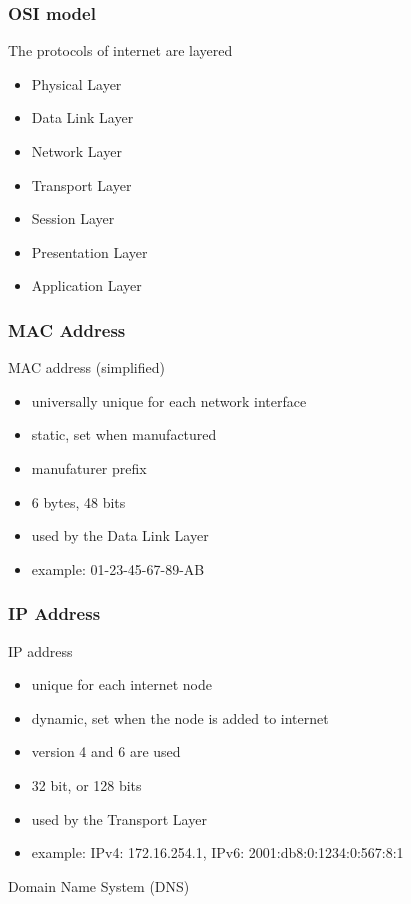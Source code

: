 \begin{frame}[fragile] \frametitle{OSI model}
The protocols of internet are layered
\begin{itemize}
  \item Physical Layer
  \item Data Link Layer
  \item Network Layer
  \item Transport Layer
  \item Session Layer
  \item Presentation Layer
  \item Application Layer
\end{itemize}
\end{frame}

\begin{frame}[fragile]\frametitle{MAC Address}
MAC address (simplified)
\begin{itemize}
  \item universally unique for each network interface
  \item static, set when manufactured
  \item manufaturer prefix
  \item 6 bytes, 48 bits
  \item used by the Data Link Layer
  \item example: 01-23-45-67-89-AB
\end{itemize}
\end{frame}

\begin{frame}[fragile]\frametitle{IP Address}
IP address
\begin{itemize}
  \item unique for each internet node
  \item dynamic, set when the node is added to internet
  \item version 4 and 6 are used
  \item 32 bit, or 128 bits
  \item used by the Transport Layer
  \item example: IPv4: 172.16.254.1, IPv6: 2001:db8:0:1234:0:567:8:1
\end{itemize}
Domain Name System (DNS)
\end{frame}

